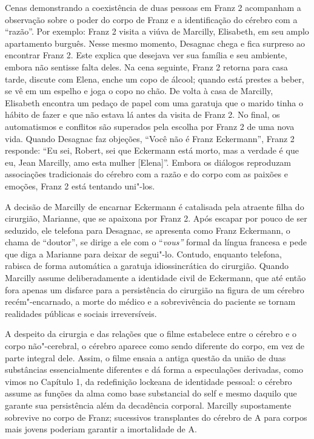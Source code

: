 Cenas demonstrando a coexistência de duas pessoas em Franz 2 acompanham
a observação sobre o poder do corpo de Franz e a identificação do
cérebro com a ``razão''. Por exemplo: Franz 2 visita a viúva de
Marcilly, Elisabeth, em seu amplo apartamento burguês. Nesse mesmo
momento, Desagnac chega e fica surpreso ao encontrar Franz 2. Este
explica que desejava ver sua família e seu ambiente, embora não sentisse
falta deles. Na cena seguinte, Franz 2 retorna para casa tarde, discute
com Elena, enche um copo de álcool; quando está prestes a beber, se vê
em um espelho e joga o copo no chão. De volta à casa de Marcilly,
Elisabeth encontra um pedaço de papel com uma garatuja que o marido
tinha o hábito de fazer e que não estava lá antes da visita de Franz 2.
No final, os automatismos e conflitos são superados pela escolha por
Franz 2 de uma nova vida. Quando Desagnac faz objeções, ``Você não é
Franz Eckermann'', Franz 2 responde: ``Eu sei, Robert, sei que Eckermann
está morto, mas a verdade é que eu, Jean Marcilly, amo esta mulher
{[}Elena{]}''. Embora os diálogos reproduzam associações tradicionais do
cérebro com a razão e do corpo com as paixões e emoções, Franz 2 está
tentando uni"-los.

A decisão de Marcilly de encarnar Eckermann é catalisada pela atraente
filha do cirurgião, Marianne, que se apaixona por Franz 2. Após escapar
por pouco de ser seduzido, ele telefona para Desagnac, se apresenta como
Franz Eckermann, o chama de ``doutor'', se dirige a ele com o
``\emph{vous''} formal da língua francesa e pede que diga a Marianne
para deixar de segui"-lo. Contudo, enquanto telefona, rabisca de forma
automática a garatuja idiossincrática do cirurgião. Quando Marcilly
assume deliberadamente a identidade civil de Eckermann, que até então
fora apenas um disfarce para a persistência do cirurgião na figura de um
cérebro recém"-encarnado, a morte do médico e a sobrevivência do paciente
se tornam realidades públicas e sociais irreversíveis.

A despeito da cirurgia e das relações que o filme estabelece entre o
cérebro e o corpo não"-cerebral, o cérebro aparece como sendo diferente
do corpo, em vez de parte integral dele. Assim, o filme ensaia a antiga
questão da união de duas substâncias essencialmente diferentes e dá
forma a especulações derivadas, como vimos no Capítulo 1, da redefinição
lockeana de identidade pessoal: o cérebro assume as funções da alma como
base substancial do self e mesmo daquilo que garante sua persistência
além da decadência corporal. Marcilly supostamente sobrevive no corpo de
Franz; sucessivos transplantes do cérebro de A para corpos mais jovens
poderiam garantir a imortalidade de A.

